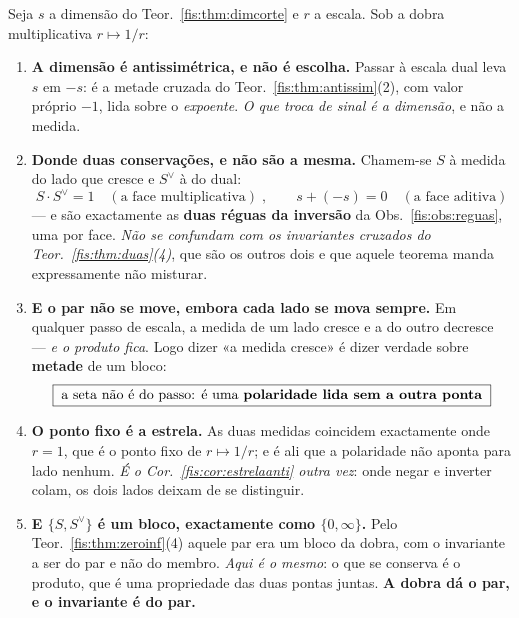 \documentclass[livro.tex]{subfiles}
\begin{document}
\begin{teorema}\label{fis:thm:fractalnegro}
Seja $s$ a dimensão do Teor.~\ref{fis:thm:dimcorte} e $r$ a escala. Sob a dobra
multiplicativa $r\mapsto1/r$:
\begin{enumerate}\itemsep3pt
\item[(1)] \textbf{A dimensão é antissimétrica, e não é escolha.} Passar à escala
dual leva $s$ em $-s$: é a metade cruzada do Teor.~\ref{fis:thm:antissim}(2), com
valor próprio $-1$, lida sobre o \emph{expoente}. \emph{O que troca de sinal é a
dimensão}, e não a medida.
\item[(2)] \textbf{Donde duas conservações, e não são a mesma.} Chamem-se $S$ à
medida do lado que cresce e $S^{\vee}$ à do dual:
\[
\boxed{\;S\cdot S^{\vee}=1\quad(\text{a face multiplicativa})\;,\qquad
s+(-s)=0\quad(\text{a face aditiva})\;}
\]
--- e são exactamente as \textbf{duas réguas da inversão} da
Obs.~\ref{fis:obs:reguas}, uma por face. \emph{Não se confundam com os
invariantes cruzados do Teor.~\ref{fis:thm:duas}(4)}, que são os outros dois e
que aquele teorema manda expressamente não misturar.
\item[(3)] \textbf{E o par não se move, embora cada lado se mova sempre.} Em
qualquer passo de escala, a medida de um lado cresce e a do outro decresce ---
\emph{e o produto fica}. Logo dizer «a medida cresce» é dizer verdade sobre
\textbf{metade} de um bloco:
\[
\boxed{\;\text{a seta não é do passo: é uma \textbf{polaridade lida sem a outra ponta}}\;}
\]
\item[(4)] \textbf{O ponto fixo é a estrela.} As duas medidas coincidem
exactamente onde $r=1$, que é o ponto fixo de $r\mapsto1/r$; e é ali que a
polaridade não aponta para lado nenhum. \emph{É o Cor.~\ref{fis:cor:estrelaanti}
outra vez}: onde negar e inverter colam, os dois lados deixam de se distinguir.
\item[(5)] \textbf{E $\{S,S^{\vee}\}$ é um bloco, exactamente como
$\{0,\infty\}$.} Pelo Teor.~\ref{fis:thm:zeroinf}(4) aquele par era um bloco da
dobra, com o invariante a ser do par e não do membro. \emph{Aqui é o mesmo}: o
que se conserva é o produto, que é uma propriedade das duas pontas juntas.
\textbf{A dobra dá o par, e o invariante é do par.}
\end{enumerate}
\end{teorema}
\end{document}
